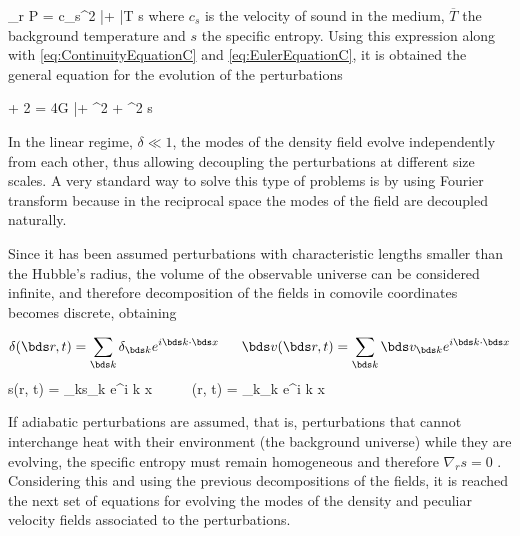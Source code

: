 { \nabla_r P = c_s^2 \bar \rho \nabla \delta + 
\bar T \rho \nabla s }
where $c_s$ is the velocity of sound in the medium, $\overline T$ the 
background temperature and $s$ the specific entropy. Using this expression
along with \ref{eq:ContinuityEquationC} and \ref{eq:EulerEquationC}, it is
obtained the general equation for the evolution of the perturbations



{  + 2  = 
4\pi G \bar \rho \delta + \nabla^2 \delta +
\nabla^2 s }


In the linear regime, $\delta \ll 1$, the modes of the density field 
evolve independently from each other, thus allowing decoupling the 
perturbations at different size scales. A very standard way to solve this 
type of problems is by using Fourier transform because in the reciprocal 
space the modes of the field are decoupled naturally.


Since it has been assumed perturbations with characteristic lengths 
smaller than the Hubble's radius, the volume of the observable universe 
can be considered infinite, and therefore decomposition of the fields 
in comovile coordinates becomes discrete, obtaining

 

\[  \delta(\bds r, t) =  \sum_{\bds k}\delta_{\bds k} e^{i \bds k \cdot \bds x} 
\ \ \ \ \ 
	\bds v(\bds r, t) =  \sum_{\bds k}\bds v_{\bds k} e^{i \bds k \cdot \bds x}\]
\eq{eq:FourierFields}
{  s(\bds r, t) =  \sum_{\bds k}s_{\bds k} e^{i \bds k \cdot \bds x} 
\ \ \ \ \ 
	\Phi(\bds r, t) =  \sum_{\bds k}\Phi_{\bds k} e^{i \bds k \cdot \bds x}}


If adiabatic perturbations are assumed, that is, perturbations that 
cannot interchange heat with their environment (the background universe) 
while they are evolving, the specific entropy must remain homogeneous and
therefore $\nabla_r s = 0$ \cite{longair2008}. Considering this and using
the previous decompositions of the fields, it is reached the next set of 
equations for evolving the modes of the density and peculiar velocity 
fields associated to the perturbations.



